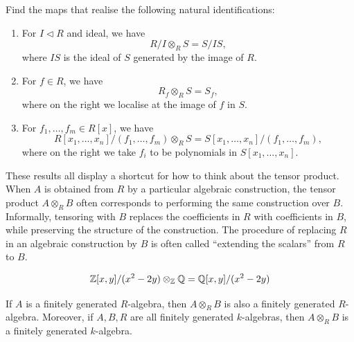 \begin{exercise}
    Find the maps that realise the following natural identifications:
    \begin{enumerate}
        \item For $I\lhd R$ and ideal, we have
        \[
        R/I\otimes_RS=S/IS,
        \]
        where $IS$ is the ideal of $S$ generated by the image of $R$.
        \item For $f\in R$, we have
        \[
        R_f\otimes_RS=S_f,
        \]
        where on the right we localise at the image of $f$ in $S$. 
        \item For $f_1,\ldots,f_m\in R[x]$, we have
        \[
        R[x_1,\ldots,x_n]/(f_1,\ldots,f_m)\otimes_RS=S[x_1,\ldots,x_n]/(f_1,\ldots,f_m),
        \]
        where on the right we take $f_i$ to be polynomials in $S[x_1,\ldots,x_n]$.
    \end{enumerate}
\end{exercise}
\begin{remark}
  These results all display a shortcut for how to think about the tensor product. When $A$ is obtained from $R$ by a particular algebraic construction, the tensor product $A\otimes_RB$ often corresponds to performing the same construction over $B$. Informally, tensoring with $B$ replaces the coefficients in $R$ with coefficients in $B$, while preserving the structure of the construction.
  The procedure of replacing \(R\) in an algebraic construction by \(B\) is often called ``extending the scalars'' from \(R\) to \(B\).
\end{remark}
\begin{example}
    \[
    \mathbb{Z}[x,y]/(x^2-2y)\otimes_{\mathbb{Z}}\mathbb{Q}=\mathbb{Q}[x,y]/(x^2-2y)
    \]
\end{example}
\begin{corollary}
    If $A$ is a finitely generated $R$-algebra, then $A\otimes_RB$ is also a finitely generated $R$-algebra. Moreover, if $A,B,R$ are all finitely generated $k$-algebras, then $A\otimes_RB$ is a finitely generated $k$-algebra.
\end{corollary}
